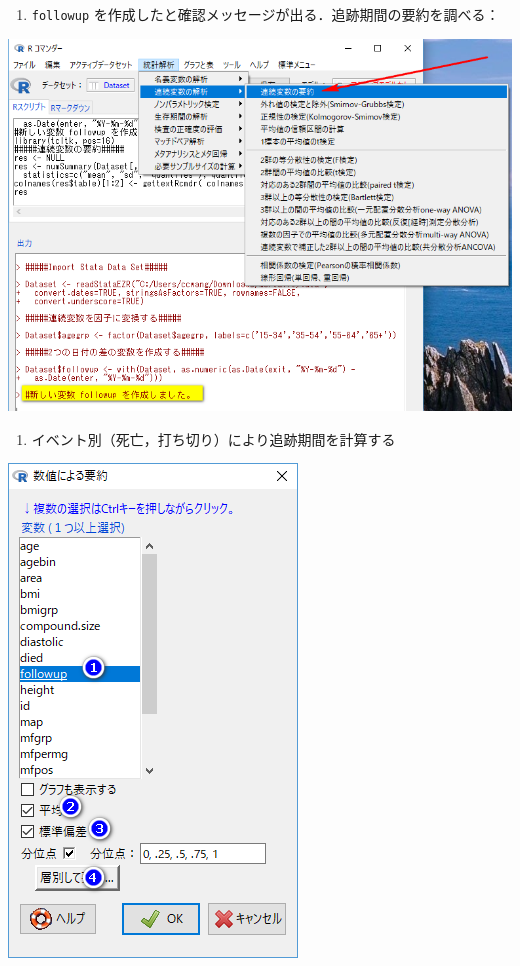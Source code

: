 \documentclass[]{problemset}
\providecommand{\tightlist}{%
  \setlength{\itemsep}{0pt}\setlength{\parskip}{0pt}}
\begin{document}
\begin{enumerate}
\def\labelenumi{\arabic{enumi}.}
\setcounter{enumi}{2}
\tightlist
\item
  \texttt{followup}
  を作成したと確認メッセージが出る．追跡期間の要約を調べる：
\end{enumerate}

\begin{center}\includegraphics[width=0.7\linewidth,height=0.35\textheight]{pic/survival02} \end{center}

\begin{enumerate}
\def\labelenumi{\arabic{enumi}.}
\setcounter{enumi}{3}
\tightlist
\item
  イベント別（死亡，打ち切り）により追跡期間を計算する
\end{enumerate}

\begin{center}\includegraphics[width=0.55\linewidth,height=0.35\textheight]{pic/survival03} \end{center}
\end{document}
